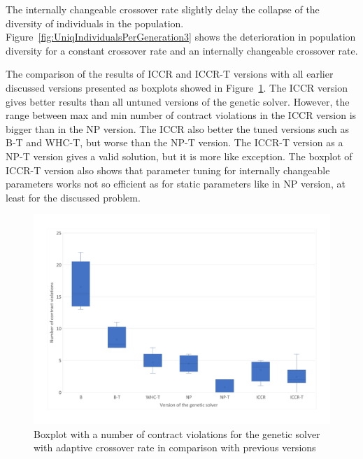 The internally changeable crossover rate slightly delay the collapse of the diversity of individuals in the population. Figure~\ref{fig:UniqIndividualsPerGeneration3} shows the deterioration in population diversity for a constant crossover rate and an internally changeable crossover rate.


The comparison of the results of ICCR and ICCR-T versions with all earlier discussed versions presented as boxplots showed in Figure~\ref{fig:boxplotsolverAdaptiveCrossoverTuning}. The ICCR version gives better results than all untuned versions of the genetic solver. However, the range between max and min number of contract violations in the ICCR version is bigger than in the NP version.
The ICCR also better the tuned versions such as B-T and WHC-T, but worse than the NP-T version. The ICCR-T version as a NP-T version gives a valid solution, but it is more like exception. The boxplot of ICCR-T version also shows that parameter tuning for internally changeable parameters works not so efficient as for static parameters like in NP version, at least for the discussed problem. 

\begin{figure}
	\centering
	\includegraphics[width=\textwidth]{images/BoxPlotSolverAdaptiveCrossoverTuning.pdf}
	\caption[Boxplot with a number of contract violations for the genetic solver with adaptive crossover rate in comparison with previous versions]{Boxplot with a number of contract violations for the genetic solver with adaptive crossover rate in comparison with previous versions}
	\label{fig:boxplotsolverAdaptiveCrossoverTuning}
\end{figure}


